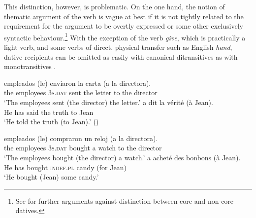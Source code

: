 \documentclass[output=paper,colorlinks,citecolor=brown,nonflat]{./langscibook}
\begin{document}
This distinction, however, is problematic. On the one hand, the notion of thematic argument of the verb is vague at best if it is not tightly related to the requirement for the argument to be overtly expressed or some other exclusively syntactic behaviour.\footnote{See \citet{FernándezAlcalde2014} for further arguments against  distinction between core and non-core datives.}  With the exception of the verb \textit{give}, which is practically a light verb, and some verbs of direct, physical transfer such as English \textit{hand}, dative recipients can be omitted as easily with canonical ditransitives  as with monotransitives . 

\ea%
    \label{ex:cuervo:1}
    \ea%
        \label{ex:cuervo:1a}
         {empleados} {(le)}          {enviaron}  {la} {carta} {(a} {la} {directora).}\\
             the employees {3\textsc{s.dat}} sent        the letter to the director\\
        \glt ‘The employees sent (the director) the letter.’
    \ex%
        \label{ex:cuervo:1b}
         {a} {dit} {la} {vérité} {(à} {Jean)}.\\
        He has said the truth to Jean\\
        \glt ‘He told the truth (to Jean).’  (\citealt{BonehNash2012}) 
    \z
\z



\ea%
    \label{ex:cuervo:2}
    \ea%
        \label{ex:cuervo:2a}
         {empleados} {(le)} {compraron} {un} {reloj} {(a} {la} {directora)}.\\
                   the employees {\textsc{3s.dat}} bought a watch to the director\\
        \glt ‘The employees bought (the director) a watch.’
    \ex%
        \label{ex:cuervo:2b}
         {a} {acheté} {des} {bonbons} {(à} {Jean)}.\\
        He has bought {\textsc{indef.pl}} candy (for Jean)\\
        \glt ‘He bought (Jean) some candy.’
    \z
\z
\end{document}
